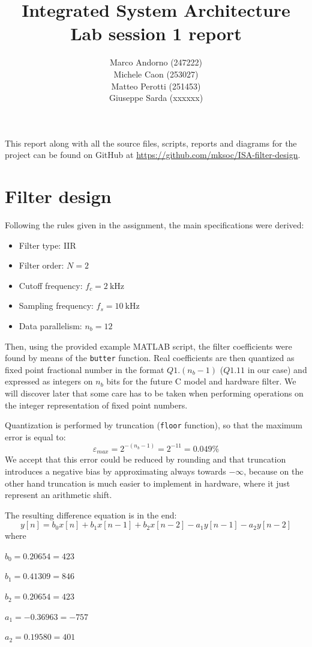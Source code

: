 \documentclass[a4paper]{article}
\title{Integrated System Architecture \\ Lab session 1 report}
\author{Marco Andorno (247222)\\ Michele Caon (253027) \\ Matteo Perotti (251453) \\ Giuseppe Sarda (xxxxxx)}
\begin{document}
\maketitle

This report along with all the source files, scripts, reports and diagrams for the project can be found on GitHub at \url{https://github.com/mksoc/ISA-filter-design}.
\tableofcontents

\section{Filter design}
Following the rules given in the assignment, the main specifications were derived:
\begin{itemize}
    \item Filter type: IIR
    \item Filter order: \(N = 2\)
    \item Cutoff frequency: $f_c = \SI{2}{\kilo\hertz}$
    \item Sampling frequency: $f_s = \SI{10}{\kilo\hertz}$
    \item Data parallelism: $n_b = 12$
\end{itemize}
Then, using the provided example MATLAB script, the filter coefficients were found by means of the \texttt{butter} function. Real coefficients are then quantized as fixed point fractional number in the format $Q1.(n_b-1)$ ($Q1.11$ in our case) and expressed as integers on $n_b$ bits for the future C model and hardware filter. We will discover later that some care has to be taken when performing operations on the integer representation of fixed point numbers. 

Quantization is performed by truncation (\texttt{floor} function), so that the maximum error is equal to:
\begin{equation}\label{eq:emax}
    \varepsilon_{max} = 2^{-(n_b-1)} = 2^{-11} = 0.049\%
\end{equation}
We accept that this error could be reduced by rounding and that truncation introduces a negative bias by approximating always towards \(-\infty\), because on the other hand truncation is much easier to implement in hardware, where it just represent an arithmetic shift.

The resulting difference equation is in the end:
\[y[n] = b_0x[n] + b_1x[n-1] + b_2x[n-2] - a_1y[n-1] - a_2y[n-2]\]
where
\begin{description}
    \item \(b_0 = 0.20654 = 423\)
    \item \(b_1 = 0.41309 = 846\)
    \item \(b_2 = 0.20654 = 423\)
    \item \(a_1 = -0.36963 = -757\)
    \item \(a_2 = 0.19580 = 401\)
\end{description}
\end{document}
